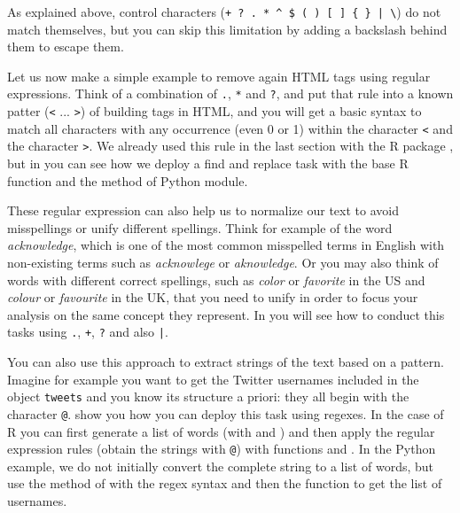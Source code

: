 As explained above, control characters (\verb!+ ? . * ^ $ ( ) [ ] { } | \!) do not match themselves, but you can skip this limitation by adding a backslash behind them to escape them.

Let us now make a simple example to remove again HTML tags using regular expressions. Think of a combination of \verb+.+, \verb+*+ and \verb+?+, and put that rule into a known patter (\verb+<+ ... \verb+>+) of building tags in HTML, and you will get a basic syntax to match all characters with any occurrence (even 0 or 1) within the character \verb+<+ and the character \verb+>+. We already used this rule in the last section with the R package , but in  you can see how we deploy a find and replace task with the base R function  and the method  of Python  module.		


These regular expression can also help us to normalize our text to avoid misspellings or unify different spellings. Think for example of the word \emph{acknowledge}, which is one of the most common misspelled terms in English with non-existing terms such as \emph{acknowlege} or \emph{aknowledge}. Or you may also think of words with different correct spellings, such as \emph{color} or \emph{favorite} in the US and \emph{colour} or \emph{favourite} in the UK, that you need to unify in order to focus your analysis on the same concept they represent. In  you will see how to conduct this tasks using \verb+.+, \verb|+|, \verb+?+ and also \verb+|+.


You can also use this approach to extract strings of the text based on a pattern. Imagine for example you want to get the Twitter usernames included in the object \texttt{tweets} and you know its structure a priori: they all begin with the character \texttt{@}.  show you how you can deploy this task using regexes. In the case of R you can first generate a list of words (with  and ) and then apply the regular expression rules (obtain the strings with \texttt{@}) with functions  and . In the Python example, we do not initially convert the complete string to a list of words, but use the  method of  with the regex syntax and then the function  to get the list of usernames.

